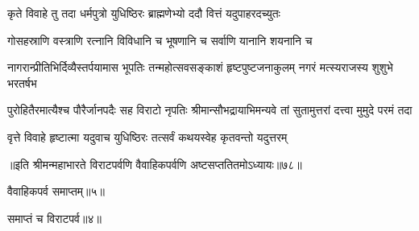 \twolineshloka
{कृते विवाहे तु तदा धर्मपुत्रो युधिष्ठिरः}
{ब्राह्मणेभ्यो ददौ वित्तं यदुपाहरदच्युतः}


\twolineshloka
{गोसहस्राणि वस्त्राणि रत्नानि विविधानि च}
{भूषणानि च सर्वाणि यानानि शयनानि च}


\onelineshloka
{नागरान्प्रीतिभिर्दिव्यैस्तर्पयामास भूपतिः}
\twolineshloka
{तन्महोत्सवसङ्काशं हृष्टपुष्टजनाकुलम्}
{नगरं मत्स्यराजस्य शुशुभे भरतर्षभ}


\threelineshloka
{पुरोहितैरमात्यैश्च पौरैर्जानपदैः सह}
{विराटो नृपतिः श्रीमान्सौभद्रायाभिमन्यवे}
{तां सुतामुत्तरां दत्त्वा मुमुदे परमं तदा}




\twolineshloka
{वृत्ते विवाहे हृष्टात्मा यदुवाच युधिष्ठिरः}
{तत्सर्वं कथयस्वेह कृतवन्तो यदुत्तरम्}

॥इति श्रीमन्महाभारते विराटपर्वणि वैवाहिकपर्वणि अष्टसप्ततितमोऽध्यायः॥७८॥ 

वैवाहिकपर्व समाप्तम्॥५॥ 

समाप्तं च विराटपर्व॥४॥
